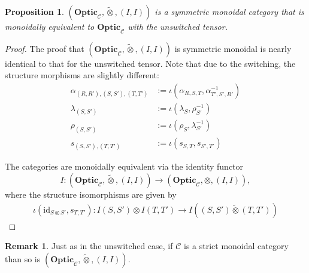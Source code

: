 \documentclass[11pt,a4paper]{article}
\theoremstyle{plain}
\newtheorem{proposition}[theorem]{Proposition}
\theoremstyle{definition}
\newtheorem{remark}[theorem]{Remark}
\newcommand{\C}{\mathscr{C}}
\newcommand{\Optic}{\mathbf{Optic}}
\newcommand{\switched}{\mathbin{\tilde{\otimes}}}
\newcommand{\id}{\mathrm{id}}
\begin{document}
\begin{proposition}
  $(\Optic_\C, \switched, (I, I))$ is a symmetric monoidal category that is monoidally equivalent to $\Optic_\C$ with the unswitched tensor.
\end{proposition}
\begin{proof}
  The proof that $(\Optic_\C, \switched, (I, I))$ is symmetric monoidal is nearly identical to that for the unswitched tensor. Note that due to the switching, the structure morphisms are slightly different:
  \begin{align*}
    \alpha_{(R, R'), (S, S'), (T, T')} &:= \iota(\alpha_{R,S,T}, \alpha_{T',S',R'}^{-1}) \\
    \lambda_{(S, S')} &:= \iota(\lambda_{S}, \rho_{S'}^{-1}) \\
    \rho_{(S, S')} &:= \iota(\rho_{S}, \lambda_{S'}^{-1}) \\
    s_{(S, S'), (T, T')} &:= \iota(s_{S, T}, s_{S', T'})
  \end{align*}

  The categories are monoidally equivalent via the identity functor \[I : (\Optic_\C, \switched, (I, I)) \to (\Optic_\C, \otimes, (I, I)),\] where the structure isomorphisms are given by
  \begin{align*}
    \iota(\id_{S \otimes S'}, s_{T, T'}) : I(S, S') \otimes I(T, T') \to I((S, S') \switched (T, T'))
  \end{align*}

\end{proof}

\begin{remark}
  Just as in the unswitched case, if $\C$ is a strict monoidal category than so is $(\Optic_\C, \switched, (I, I))$.
\end{remark}
\end{document}
